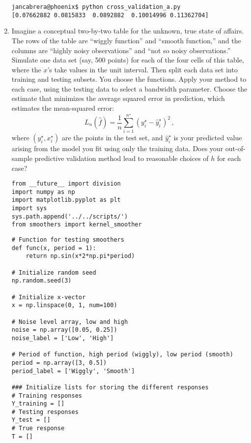 \documentclass[10pt]{article}
\begin{document}
\begin{enumerate}[label=(\Alph*)]
        \verb|jancabrera@phoenix$ python cross_validation_a.py| \\
        \verb|[0.07662882 0.0815833  0.0892882  0.10014996 0.11362704]|

        \item Imagine a conceptual two-by-two table for the unknown, true state of affairs.  The rows of the table are ``wiggly function'' and ``smooth function,'' and the columns are ``highly noisy observations'' and ``not so noisy observations.''  Simulate one data set (say, 500 points) for each of the four cells of this table, where the $x$'s take values in the unit interval.  Then split each data set into training and testing subsets.  You choose the functions. Apply your method to each case, using the testing data to select a bandwidth parameter.  Choose the estimate that minimizes the average squared error in prediction, which estimates the mean-squared error:
        $$
        L_n(\hat{f}) = \frac{1}{n}\sum_{i=1}^{n^{\star}} (y^{\star}_i - \hat{y}_i^{\star} )^2 \, ,
        $$
        where $(y_i^{\star}, x_i^{\star})$ are the points in the test set, and $ \hat{y}_i^{\star}$ is your predicted value arising from the model you fit using only the training data.  Does your out-of-sample predictive validation method lead to reasonable choices of $h$ for each case?

        \begin{lstlisting}
from __future__ import division
import numpy as np 
import matplotlib.pyplot as plt
import sys
sys.path.append('../../scripts/')
from smoothers import kernel_smoother
        \end{lstlisting}

        \begin{lstlisting}
# Function for testing smoothers
def func(x, period = 1):
    return np.sin(x*2*np.pi*period)

# Initialize random seed
np.random.seed(3)

# Initialize x-vector
x = np.linspace(0, 1, num=100)

# Noise level array, low and high
noise = np.array([0.05, 0.25])
noise_label = ['Low', 'High']

# Period of function, high period (wiggly), low period (smooth)
period = np.array([3, 0.5])
period_label = ['Wiggly', 'Smooth']

### Initialize lists for storing the different responses
# Training responses
Y_training = []
# Testing responses
Y_test = []
# True response
T = []
        \end{lstlisting}


\end{enumerate}
\end{document}
